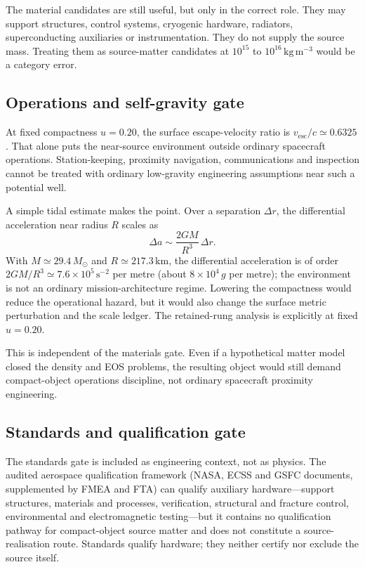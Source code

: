 \documentclass[11pt,a4paper]{article}
\begin{document}
The material candidates are still useful, but only in the correct role. They may support structures, control systems, cryogenic hardware, radiators, superconducting auxiliaries or instrumentation. They do not supply the source mass. Treating them as source-matter candidates at $10^{15}$ to $10^{16}\,\mathrm{kg\,m^{-3}}$ would be a category error.

\subsection{Operations and self-gravity gate}

At fixed compactness $u=0.20$, the surface escape-velocity ratio is $v_{\mathrm{esc}}/c\simeq0.6325$. That alone puts the near-source environment outside ordinary spacecraft operations. Station-keeping, proximity navigation, communications and inspection cannot be treated with ordinary low-gravity engineering assumptions near such a potential well.

A simple tidal estimate makes the point. Over a separation $\Delta r$, the differential acceleration near radius $R$ scales as
\[
\Delta a \sim \frac{2GM}{R^{3}}\,\Delta r.
\]
With $M\simeq29.4\,M_{\odot}$ and $R\simeq217.3\,\mathrm{km}$, the differential acceleration is of order $2GM/R^{3}\simeq7.6\times10^{5}\,\mathrm{s^{-2}}$ per metre (about $8\times10^{4}\,g$ per metre); the environment is not an ordinary mission-architecture regime. Lowering the compactness would reduce the operational hazard, but it would also change the surface metric perturbation and the scale ledger. The retained-rung analysis is explicitly at fixed $u=0.20$.

This is independent of the materials gate. Even if a hypothetical matter model closed the density and EOS problems, the resulting object would still demand compact-object operations discipline, not ordinary spacecraft proximity engineering.

\subsection{Standards and qualification gate}

The standards gate is included as engineering context, not as physics. The audited aerospace qualification framework (NASA, ECSS and GSFC documents, supplemented by FMEA and FTA) can qualify auxiliary hardware---support structures, materials and processes, verification, structural and fracture control, environmental and electromagnetic testing---but it contains no qualification pathway for compact-object source matter and does not constitute a source-realisation route. Standards qualify hardware; they neither certify nor exclude the source itself. \cite{NASASP20166105,GSFC7000B,NASASTD6016C,ECSSEST1002C}
\end{document}
